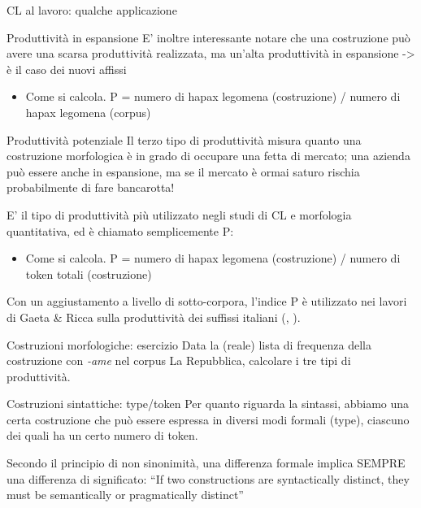 \documentclass[pdf]{prosper}
\begin{document}
\begin{tsectionandpart}{CL al lavoro: qualche applicazione}
\begin{slide}{Produttività in espansione}
E' inoltre interessante notare che una costruzione può avere una scarsa produttività realizzata, ma un'alta produttività in espansione -> è il caso dei nuovi affissi

	\begin{itemize}
		\item Come si calcola. P = numero di hapax legomena (costruzione) / numero di hapax legomena (corpus)
	\end{itemize}

\end{slide}

\begin{slide}{Produttività potenziale}
Il terzo tipo di produttività misura quanto una costruzione morfologica è in grado di occupare una fetta di mercato; una azienda può essere anche in espansione, ma se il mercato è ormai saturo rischia probabilmente di fare bancarotta!

E' il tipo di produttività più utilizzato negli studi di CL e morfologia quantitativa, ed è chiamato semplicemente P:

\begin{itemize}
\item Come si calcola. P = numero di hapax legomena (costruzione) / numero di token totali (costruzione)
\end{itemize}

Con un aggiustamento a livello di sotto-corpora, l'indice P è utilizzato nei lavori di Gaeta \& Ricca sulla produttività dei suffissi italiani (\citealt{GaetaRicca2003}, \citealt{GaetaRicca2006}).
\end{slide}

\begin{slide}{Costruzioni morfologiche: esercizio}
Data la (reale) lista di frequenza della costruzione con {\it -ame} nel corpus La Repubblica, calcolare i tre tipi di produttività.

\end{slide}

\begin{slide}{Costruzioni sintattiche: type/token}
Per quanto riguarda la sintassi, abbiamo una certa costruzione che può essere espressa in diversi modi formali (type), ciascuno dei quali ha un certo numero di token.

Secondo il principio di non sinonimità, una differenza formale implica SEMPRE una differenza di significato: ``If two constructions are syntactically distinct, they must be semantically or pragmatically distinct''


\end{slide}
\end{tsectionandpart}
\end{document}
